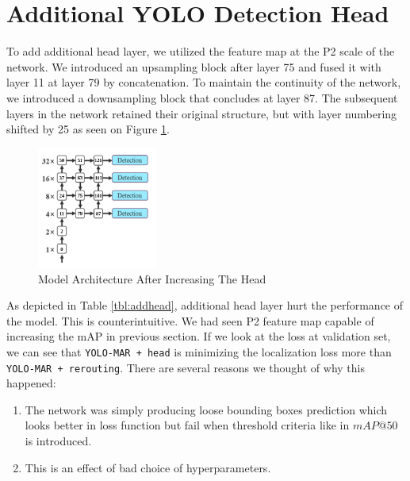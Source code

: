 \section{Additional YOLO Detection Head}
To add additional head layer, we utilized the feature map at the P2 scale of the network.
We introduced an upsampling block after layer 75 and fused it with layer 11 at layer 79 by concatenation.
To maintain the continuity of the network, we introduced a downsampling block that concludes at layer 87.
The subsequent layers in the network retained their original structure, but with layer numbering shifted by 25
as seen on Figure \ref{fig:addinghead}.
\begin{figure}
  \centering
  \includegraphics[width=0.35\textwidth]{figures/addheadn.png}
  \caption{Model Architecture After Increasing The Head}
  \label{fig:addinghead}
\end{figure}

\begin{table}
  \centering
  \label{tbl:addhead}
  \vspace{-1ex}
  
\end{table}

As depicted in Table \ref{tbl:addhead}, additional head layer hurt the performance of the model.
This is counterintuitive. We had seen P2 feature map capable of increasing the mAP in previous section.
If we look at the loss at validation set, we can see that \verb|YOLO-MAR + head| is 
minimizing the localization loss more than \verb|YOLO-MAR + rerouting|.
There are several reasons we thought of why this happened:
\begin{enumerate}
  \item The network was simply producing loose bounding boxes prediction which looks better in loss function
  but fail when threshold criteria like in $mAP@50$ is introduced.

  \item This is an effect of bad choice of hyperparameters.
\end{enumerate}

